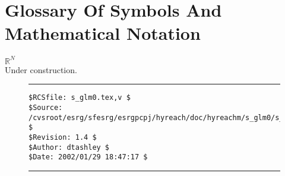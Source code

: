 %
\section{Glossary Of Symbols And Mathematical Notation}
\label{sglm0}

\begin{glossaryenum}
\item {\boldmath{}$\mathbb{R}^N$} \\
      Under construction.
\end{glossaryenum}


\noindent\begin{figure}[!b]
\noindent\rule[-0.25in]{\textwidth}{1pt}
\begin{tiny}
\begin{verbatim}
$RCSfile: s_glm0.tex,v $
$Source: /cvsroot/esrg/sfesrg/esrgpcpj/hyreach/doc/hyreachm/s_glm0/s_glm0.tex,v $
$Revision: 1.4 $
$Author: dtashley $
$Date: 2002/01/29 18:47:17 $
\end{verbatim}
\end{tiny}
\noindent\rule[0.25in]{\textwidth}{1pt}
\end{figure}
%
%
%
%
